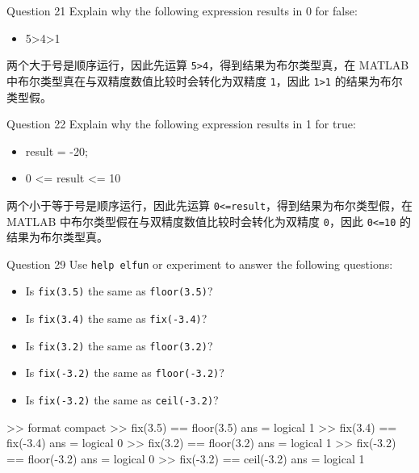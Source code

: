 \begin{statebox}{Question 21}{}
    Explain why the following expression results in 0 for false:
    \begin{itemize}
        \item 5>4>1
    \end{itemize}
\end{statebox}
两个大于号是顺序运行，因此先运算 \verb|5>4|，得到结果为布尔类型真，在 MATLAB 中布尔类型真在与双精度数值比较时会转化为双精度 \verb|1|，因此 \verb|1>1| 的结果为布尔类型假。


\begin{statebox}{Question 22}{}
    Explain why the following expression results in 1 for true:
    \begin{itemize}
        \item result = -20;
        \item 0 <= result <= 10
    \end{itemize}
\end{statebox}
两个小于等于号是顺序运行，因此先运算 \verb|0<=result|，得到结果为布尔类型假，在 MATLAB 中布尔类型假在与双精度数值比较时会转化为双精度 \verb|0|，因此 \verb|0<=10| 的结果为布尔类型真。


\begin{statebox}{Question 29}{}
    Use \verb|help elfun| or experiment to answer the following questions:
    \begin{itemize}
        \item Is \verb|fix(3.5)| the same as \verb|floor(3.5)|?
        \item Is \verb|fix(3.4)| the same as \verb|fix(-3.4)|?
        \item Is \verb|fix(3.2)| the same as \verb|floor(3.2)|?
        \item Is \verb|fix(-3.2)| the same as \verb|floor(-3.2)|?
        \item Is \verb|fix(-3.2)| the same as \verb|ceil(-3.2)|?
    \end{itemize}
\end{statebox}
\begin{matlab}{}
>> format compact
>> fix(3.5) == floor(3.5)
ans =
  logical
   1
>> fix(3.4) == fix(-3.4)
ans =
  logical
   0
>> fix(3.2) == floor(3.2)
ans =
  logical
   1
>> fix(-3.2) == floor(-3.2)
ans =
  logical
   0
>> fix(-3.2) == ceil(-3.2)
ans =
  logical
   1
\end{matlab}


